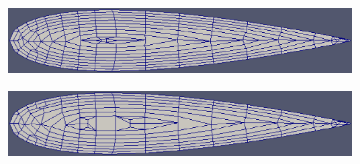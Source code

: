 \documentclass[conf]{new-aiaa}
\begin{document}
\begin{figure}

\centering

\begin{subfigure}{0.4\textwidth}
\centering
\includegraphics[width = 0.9\linewidth, trim={0 7cm  0 7cm},clip]{meshCases/naca0018-x0.007-g1.05/endCap.eps}
\caption{}
\label{fig-endCap-low}
\end{subfigure}%
\begin{subfigure}{0.4\textwidth}
\centering
\includegraphics[width=0.9\linewidth,trim={0 7cm  0 7cm},clip]{meshCases/naca0018-x0.007-g1.1/endCap.eps}
\caption{}
\label{fig-endCap-high}
\end{subfigure}


\end{figure}
\end{document}
